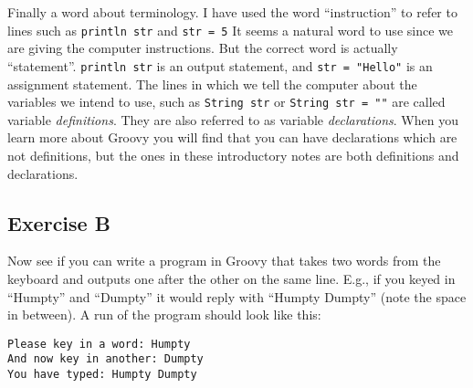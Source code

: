 Finally a word about terminology.  I have used the word ``instruction''
to refer to lines such as \verb!println str! and \verb!str = 5!
It seems a natural word to use since we are giving the computer instructions.
But the correct word is actually ``statement''.  \verb!println str! is
an output statement, and \verb!str = "Hello"! is an assignment statement.
The lines in which we tell the computer about the variables we intend to
use, such as \verb!String str! or \verb!String str = ""! are called
variable \emph{definitions}.  They are also referred to as 
variable \emph{declarations}.  When you learn more about Groovy you will
find that you can have declarations which are not definitions, but the
ones in these introductory notes are both definitions and declarations.

\subsection*{Exercise B}

Now see if you can write a program in Groovy that takes
two words from the keyboard and outputs one after the other on the same line. 
E.g., if you keyed in ``Humpty'' and ``Dumpty'' 
it would reply with ``Humpty Dumpty'' (note the space in between).
A run of the program should look like this:
\begin{Verbatim}
Please key in a word: Humpty
And now key in another: Dumpty
You have typed: Humpty Dumpty
\end{Verbatim}


 	


